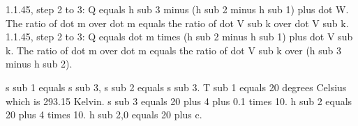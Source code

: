 1.1.45, step 2 to 3:
Q equals h sub 3 minus (h sub 2 minus h sub 1) plus dot W.
The ratio of dot m over dot m equals the ratio of dot V sub k over dot V sub k.
1.1.45, step 2 to 3:
Q equals dot m times (h sub 2 minus h sub 1) plus dot V sub k.
The ratio of dot m over dot m equals the ratio of dot V sub k over (h sub 3 minus h sub 2).

s sub 1 equals s sub 3, s sub 2 equals s sub 3.
T sub 1 equals 20 degrees Celsius which is 293.15 Kelvin.
s sub 3 equals 20 plus 4 plus 0.1 times 10.
h sub 2 equals 20 plus 4 times 10.
h sub 2,0 equals 20 plus c.